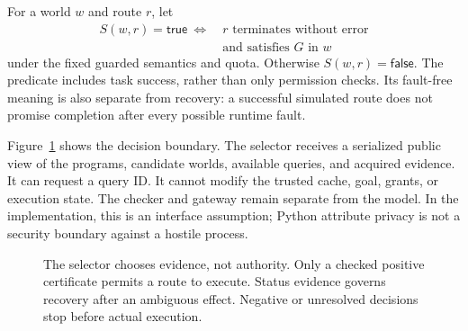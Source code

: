 \documentclass[conference]{IEEEtran}
\newcommand{\Yes}{\mathsf{true}}
\newcommand{\No}{\mathsf{false}}
\begin{document}
For a world $w$ and route $r$, let
\begin{equation}
 \begin{aligned}
 S(w,r)=\Yes\ \iff\ &\text{$r$ terminates without error}\\
                    &\text{and satisfies $G$ in $w$}
 \end{aligned}
 \label{eq:success}
\end{equation}
under the fixed guarded semantics and quota. Otherwise $S(w,r)=\No$. The predicate includes task success, rather than only permission checks. Its fault-free meaning is also separate from recovery: a successful simulated route does not promise completion after every possible runtime fault.

Figure~\ref{fig:architecture} shows the decision boundary. The selector receives a serialized public view of the programs, candidate worlds, available queries, and acquired evidence. It can request a query ID. It cannot modify the trusted cache, goal, grants, or execution state. The checker and gateway remain separate from the model. In the implementation, this is an interface assumption; Python attribute privacy is not a security boundary against a hostile process.

\begin{figure}[t]
\centering
{}
\caption{The selector chooses evidence, not authority. Only a checked positive certificate permits a route to execute. Status evidence governs recovery after an ambiguous effect. Negative or unresolved decisions stop before actual execution.}
\label{fig:architecture}
\end{figure}
\end{document}
